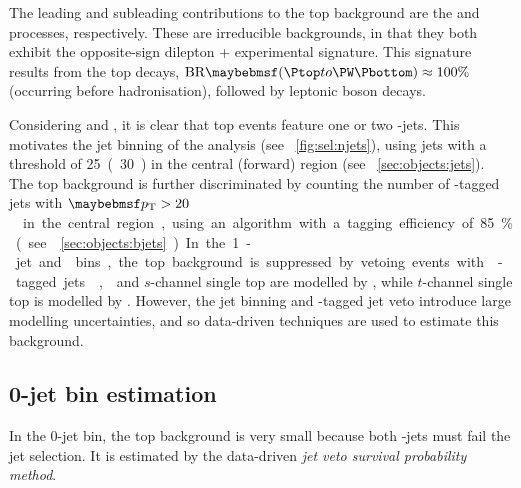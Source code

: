
The leading and subleading contributions to the top background are the \ttbar and 
\HepProcess{\PW\Ptop} processes, respectively. These are irreducible backgrounds, in that 
they both exhibit the opposite-sign dilepton + \met experimental signature. This signature 
results from the top decays, $\text{BR}\parenths{\HepProcess{\Ptop \HepTo \PW\Pbottom}} 
\approx 100\%$ (occurring before hadronisation), followed by leptonic \PW boson decays.

Considering \HepProcess{\ttbar \HepTo \PW\PW\Pbottom\Pbottom} and \HepProcess{\PW\Ptop 
\HepTo \PW\PW\Pbottom}, it is clear that top events feature one or two \Pbottom-jets. This 
motivates the jet binning of the \HWW analysis (see \Figure~\ref{fig:sel:njets}), using 
jets with a \pt threshold of \unit{25 (30)}{\GeV} in the central (forward) region (see 
\Section~\ref{sec:objects:jets}). The top background is further discriminated by counting 
the number of \Pbottom-tagged jets with \unit{$\pt > 20$}{\GeV} in the central region, 
using an algorithm with a tagging efficiency of 85\% (see \Section~\ref{sec:objects:bjets}).
In the 1-jet and \twojet bins, the top background is suppressed by vetoing events with 
\Pbottom-tagged jets.

\ttbar, \HepProcess{\PW\Ptop} and $s$-channel single top are modelled by 
, while $t$-channel single top is modelled by 
. However, the jet binning and \Pbottom-tagged jet veto 
introduce large modelling uncertainties, and so data-driven techniques are used to 
estimate this background.



\subsection{0-jet bin estimation}
\label{sec:top:0j}

In the 0-jet bin, the top background is very small because both \Pbottom-jets must fail the 
jet selection. It is estimated by the data-driven \textit{jet veto survival probability 
method}.

